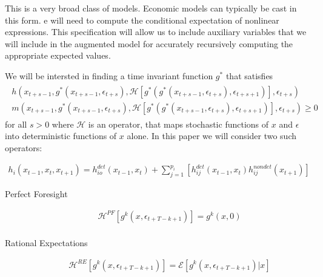 \documentclass[12pt]{article}
\begin{document}
This is a very broad class of models.  Economic models can typically 
be cast in this form.  e will need to compute the conditional expectation of nonlinear expressions.  This specification will allow us to include auxiliary
variables that we will include in the augmented model for accurately recursively computing  the appropriate expected values.

We will be intersted in
finding a time invariant function $g^\ast$ that satisfies
\begin{gather}
  \begin{split}
h(x_{t+s-1},g^\ast(x_{t+s-1},\epsilon_{t+s}),\mathcal{H}[g^\ast(g^\ast(x_{t+s-1},\epsilon_{t+s}),\epsilon_{t+s+1})],\epsilon_{t+s}) \\
m(x_{t+s-1},g^\ast(x_{t+s-1},\epsilon_{t+s}),\mathcal{H}[g^\ast(g^\ast(x_{t+s-1},\epsilon_{t+s}),\epsilon_{t+s+1})],\epsilon_{t+s}) \ge 0  \label{theProblem}
  \end{split}
 \end{gather}
 for all $s>0$ where $\mathcal{H}$ is an operator, 
  that maps stochastic functions of $x$ and $\epsilon$ into deterministic 
functions of $x$ alone.  In this paper we will consider two such operators:

\begin{gather*}
  h_i(x_{t-1},x_{t},x_{t+1})=h^{det}_{io}(x_{t-1},x_{t})+\sum_{j=1}^{p_i} [h^{det}_{ij}(x_{t-1},x_{t})h^{nondet}_{ij}(x_{t+1})]
\end{gather*}

\begin{description}
\item[Perfect Foresight]
\begin{gather*}
     \mathcal{H}^{PF}[g^{k}(x,\epsilon_{t+T-k+1})]=
g^{k}(x,0)\\
\end{gather*}


\item[Rational Expectations] 
\begin{gather*}
     \mathcal{H}^{RE}[g^{k}(x,\epsilon_{t+T-k+1})]=
\mathcal{E}[g^{k}(x,\epsilon_{t+T-k+1})|x]\\
\end{gather*}

 \end{description}
\end{document}
